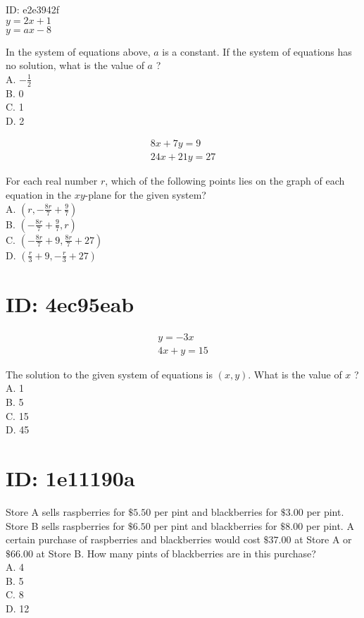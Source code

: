 ID: e2e3942f\\
$y=2 x+1$\\
$y=a x-8$

In the system of equations above, $a$ is a constant. If the system of equations has no solution, what is the value of $a$ ?\\
A. $-\frac{1}{2}$\\
B. 0\\
C. 1\\
D. 2

$$
\begin{gathered}
8 x+7 y=9 \\
24 x+21 y=27
\end{gathered}
$$

For each real number $r$, which of the following points lies on the graph of each equation in the $x y$-plane for the given system?\\
A. $\left(r,-\frac{8 r}{7}+\frac{9}{7}\right)$\\
B. $\left(-\frac{8 r}{7}+\frac{9}{7}, r\right)$\\
C. $\left(-\frac{8 r}{7}+9, \frac{8 r}{7}+27\right)$\\
D. $\left(\frac{r}{3}+9,-\frac{r}{3}+27\right)$

\section*{ID: 4ec95eab}
$$
\begin{gathered}
y=-3 x \\
4 x+y=15
\end{gathered}
$$

The solution to the given system of equations is $(x, y)$. What is the value of $x$ ?\\
A. 1\\
B. 5\\
C. 15\\
D. 45

\section*{ID: 1e11190a}
Store A sells raspberries for $\$ 5.50$ per pint and blackberries for $\$ 3.00$ per pint. Store B sells raspberries for $\$ 6.50$ per pint and blackberries for $\$ 8.00$ per pint. A certain purchase of raspberries and blackberries would cost $\$ 37.00$ at Store A or $\$ 66.00$ at Store B. How many pints of blackberries are in this purchase?\\
A. 4\\
B. 5\\
C. 8\\
D. 12


